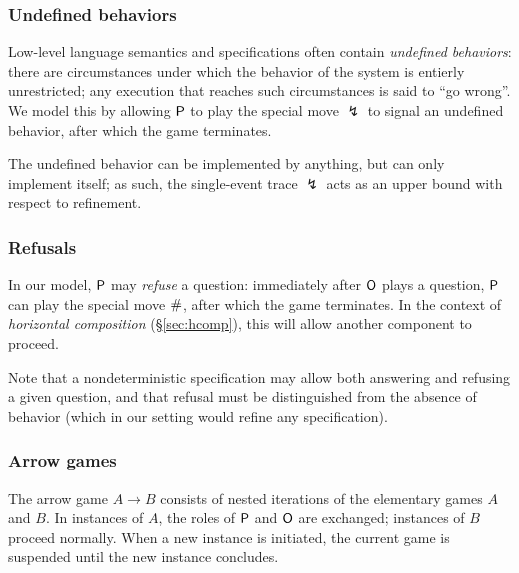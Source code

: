 
\subsubsection{Undefined behaviors} %

Low-level language semantics and specifications
often contain \emph{undefined behaviors}:
there are circumstances under which the behavior of the system
is entierly unrestricted;
any execution that reaches such circumstances is said to ``go wrong''.
We model this by allowing $ \mathsf{P} $ to play the special move
$\lightning$
to signal an undefined behavior,
after which the game terminates.

The undefined behavior can be implemented by anything,
but can only implement itself;
as such,
the single-event trace $\lightning$
acts as an upper bound with respect to refinement.


\subsubsection{Refusals} %

In our model,
$ \mathsf{P} $ may \emph{refuse} a question:
immediately after $ \mathsf{O} $ plays a question,
$ \mathsf{P} $ can play the special move $ \mathsf{\#} $,
after which the game terminates.
In the context of
\emph{horizontal composition} (\S\ref{sec:hcomp}),
this will allow another component to proceed.

Note that a nondeterministic specification
may allow both answering and refusing a given question,
and that refusal must be distinguished from
the absence of behavior
(which in our setting would refine any specification).


\subsubsection{Arrow games} %
\label{sec:arrow}

The arrow game $A \rightarrow B$ consists of
nested iterations of the elementary games $A$ and $B$.
In instances of $A$, the roles of $ \mathsf{P} $ and $ \mathsf{O} $ are exchanged;
instances of $B$ proceed normally.
When a new instance is initiated,
the current game is suspended
until the new instance concludes.

